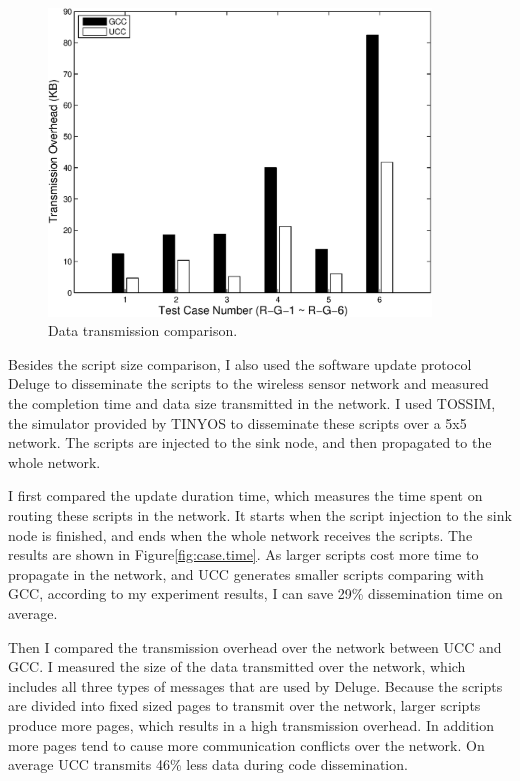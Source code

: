 \begin{figure}[htp]
\centering
\includegraphics[width=4in]{figures/bytes.eps}
\caption{Data transmission comparison.}
\label{fig:case.bytes}
\end{figure}

Besides the script size comparison, I also used the software update protocol Deluge\cite{deluge} to disseminate the scripts to the wireless sensor network and measured the completion time and data size transmitted in the network. I used TOSSIM\cite{tossim}, the simulator provided by TINYOS\cite{tinyos} to disseminate these scripts over a 5x5 network. The scripts are injected to the sink node, and then propagated to the whole network.

I first compared the update duration time, which measures the time spent on routing these scripts in the network. It starts when the script injection to the sink node is finished, and ends when the whole network receives the scripts. The results are shown in Figure\ref{fig:case.time}. As larger scripts cost more time to propagate in the network, and UCC generates smaller scripts comparing with GCC, according to my experiment results, I can save 29\% dissemination time on average.

Then I compared the transmission overhead over the network between UCC and GCC.
I measured the size of the data transmitted over the network, which includes all three types of messages that are used by Deluge\cite{deluge}. Because the scripts are divided into fixed sized pages to transmit over the network, larger scripts produce more pages, which results in a high transmission overhead. In addition more pages tend to cause more communication conflicts over the network. On average UCC transmits 46\% less data during code dissemination.

